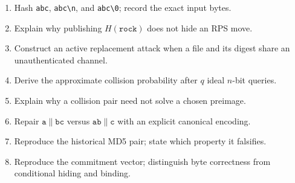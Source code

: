 \begin{enumerate}
    \setlength{\itemsep}{0.25em}
    \item Hash \texttt{abc}, \texttt{abc\textbackslash n}, and
    \texttt{abc\textbackslash0}; record the exact input bytes.
    \item Explain why publishing \(H(\mathtt{rock})\) does not hide an RPS move.
    \item Construct an active replacement attack when a file and its digest
    share an unauthenticated channel.
    \item Derive the approximate collision probability after \(q\) ideal
    \(n\)-bit queries.
    \item Explain why a collision pair need not solve a chosen preimage.
    \item Repair \(\mathtt{a}\|\mathtt{bc}\) versus
    \(\mathtt{ab}\|\mathtt{c}\) with an explicit canonical encoding.
    \item Reproduce the historical MD5 pair; state which property it falsifies.
    \item Reproduce the commitment vector; distinguish byte correctness from
    conditional hiding and binding.
\end{enumerate}
\flushbottom
